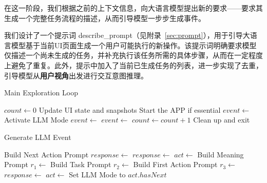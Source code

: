 \documentclass[twocolumn, 10pt]{article}
\begin{document}
在这一阶段，我们根据之前的上下文信息，向大语言模型提出新的要求——要求其生成一个完整任务流程的描述，从而引导模型一步步生成事件。

我们设计了一个提示词 describe\_prompt（见附录~\ref{sec:prompt}），用于引导大语言模型基于当前UI页面生成一个用户可能执行的新操作。该提示词明确要求模型仅描述一个尚未生成的任务，并补充执行该任务所需的具体步骤，从而在一定程度上避免了重复。此外，提示中加入了当前已生成任务的列表，进一步实现了去重，引导模型从\textbf{用户视角}出发进行交互意图推理。

\begin{algorithm}[t]
\caption{Main Exploration Loop}
\label{alg:main}
\begin{algorithmic}[1]
  \State $count \gets 0$
    \State Update UI state and snapshots
    \State Start the APP if essential
        \State $event \gets$ 
        \State Activate LLM Mode
        \State $event \gets$ 
    \Else
        \State $event \gets$ 
    \EndIf
    \State {}
    \State $count \gets count + 1$
  \EndWhile
  \State Clean up and exit
\EndFunction
\end{algorithmic}
\end{algorithm}

\begin{algorithm}[t]
\caption{Generate LLM Event}
\label{alg:generate_event}
\begin{algorithmic}[1]
          \State Build Next Action Prompt
          \State $response \gets$ 
          \State $response \gets$ 
          \State $act \gets$ 
        \Else
          \State Build Meaning Prompt
          \State $r_1 \gets$ 
          \State Build Task Prompt
          \State $r_2 \gets$ 
          \State Build First Action Prompt
          \State $r_3 \gets$ 
          \State $response \gets$ 
          \State $act \gets$ 
    \EndIf
    \State Set LLM Mode to $act.hasNext$
    \State \Return {}
\EndFunction
\end{algorithmic}
\end{algorithm}
\end{document}
